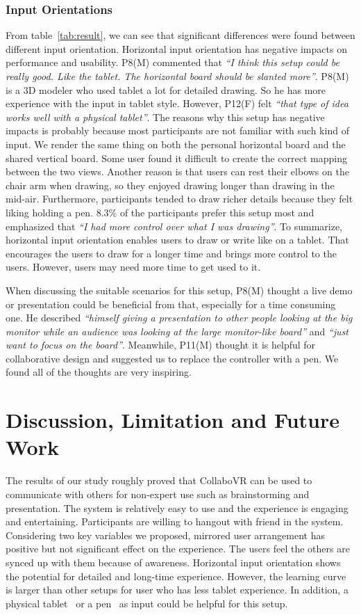 \documentclass{sigchi}
\begin{document}
\subsubsection{Input Orientations}
From table~\ref{tab:result}, we can see that significant differences were found between different input orientation. Horizontal input orientation has negative impacts on performance and usability. P8(M) commented that \textit{``I think this setup could be really good. Like the tablet. The horizontal board should be slanted more''}. P8(M) is a 3D modeler who used tablet a lot for detailed drawing. So he has more experience with the input in tablet style. However, P12(F) felt \textit{``that type of idea works well with a physical tablet''}. The reasons why this setup has negative impacts is probably because most participants are not familiar with such kind of input. We render the same thing on both the personal horizontal board and the shared vertical board. Some user found it difficult to create the correct mapping between the two views. Another reason is that users can rest their elbows on the chair arm when drawing, so they enjoyed drawing longer than drawing in the mid-air. Furthermore, participants tended to draw richer details because they felt liking holding a pen. 8.3\% of the participants prefer this setup most and emphasized that \textit{``I had more control over what I was drawing''}. To summarize, horizontal input orientation enables users to draw or write like on a tablet. That encourages the users to draw for a longer time and brings more control to the users. However, users may need more time to get used to it.

When discussing the suitable scenarios for this setup, P8(M) thought a live demo or presentation could be beneficial from that, especially for a time consuming one. He described \textit{``himself giving a presentation to other people looking at the big monitor while an audience was looking at the large monitor-like board''} and \textit{``just want to focus on the board''}. Meanwhile, P11(M) thought it is helpful for collaborative design and suggested us to replace the controller with a pen. We found all of the thoughts are very inspiring.

\section{Discussion, Limitation and Future Work}
The results of our study roughly proved that CollaboVR can be used to communicate with others for non-expert use such as brainstorming and presentation. The system is relatively easy to use and the experience is engaging and entertaining. Participants are willing to hangout with friend in the system. Considering two key variables we proposed, mirrored user arrangement has positive but not significant effect on the experience. The users feel the others are synced up with them because of awareness. Horizontal input orientation shows the potential for detailed and long-time experience. However, the learning curve is larger than other setups for user who has less tablet experience. In addition, a physical tablet~\cite{sensel} or a pen~\cite{wu2017dodecapen} as input could be helpful for this setup. 
\end{document}
